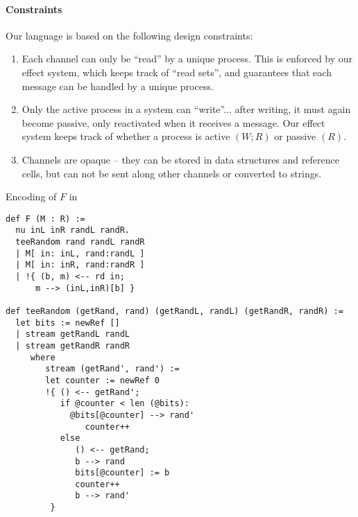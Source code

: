 \paragraph{Constraints}
Our language is based on the following design constraints:
\begin{enumerate}
\item Each channel can only be “read” by a unique process. This is enforced by our effect system, which keeps track of “read sets”, and guarantees that each message can be handled by a unique process.
\item Only the active process in a system can “write”... after writing, it must again become passive, only reactivated when it receives a message. Our effect system keeps track of whether a process is active $(W; R)$ or passive $(R)$.
\item Channels are opaque -- they can be stored in data structures and reference cells, but can not be sent along other channels or converted to strings.
\end{enumerate}



Encoding of $F$ in \lang
\begin{figure*}
\begin{lstlisting} 
def F (M : R) :=
  nu inL inR randL randR. 
  teeRandom rand randL randR
  | M[ in: inL, rand:randL ]
  | M[ in: inR, rand:randR ]
  | !{ (b, m) <-- rd in;
      m --> (inL,inR)[b] }

def teeRandom (getRand, rand) (getRandL, randL) (getRandR, randR) :=
  let bits := newRef []
  | stream getRandL randL
  | stream getRandR randR
     where
        stream (getRand', rand') :=
        let counter := newRef 0
        !{ () <-- getRand';
           if @counter < len (@bits):
             @bits[@counter] --> rand'
                counter++
           else
              () <-- getRand; 
              b --> rand
              bits[@counter] := b
              counter++
              b --> rand'
         }
\end{lstlisting}
\end{figure*}


